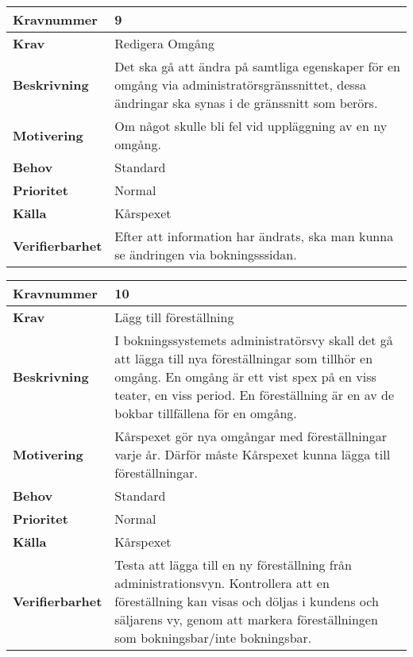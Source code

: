 \documentclass[a4paper, twoside, 11pt, titlepage]{article}
\begin{document}
\begin{tabular} { | p{3cm} | p{12.2cm} | }
	\hline
	\textbf{Kravnummer} & 9  \\
	\hline
	\textbf{Krav} & Redigera Omgång  \\
	\hline
	\textbf{Beskrivning} & Det ska gå att ändra på samtliga egenskaper för en omgång via administratörsgränssnittet, dessa ändringar ska synas i de gränssnitt som berörs.  \\
	\hline
	\textbf{Motivering} & Om något skulle bli fel vid uppläggning av en ny omgång.  \\
	\hline
	\textbf{Behov} & Standard  \\
	\hline
	\textbf{Prioritet} & Normal  \\
	\hline
	\textbf{Källa} & Kårspexet  \\
	\hline
	\textbf{Verifierbarhet} & Efter att information har ändrats, ska man kunna se ändringen via bokningsssidan.  \\
	\hline
\end{tabular}

\begin{tabular} { | p{3cm} | p{12.2cm} | }
	\hline
	\textbf{Kravnummer} & 10  \\
	\hline
	\textbf{Krav} & Lägg till föreställning  \\
	\hline
	\textbf{Beskrivning} & I bokningssystemets administratörsvy skall det gå att lägga till nya föreställningar som tillhör en omgång. En omgång är ett vist spex på en viss teater, en viss period. En föreställning är en av de bokbar tillfällena för en omgång.  \\
	\hline
	\textbf{Motivering} & Kårspexet gör nya omgångar med föreställningar varje år. Därför måste Kårspexet kunna lägga till föreställningar.  \\
	\hline
	\textbf{Behov} & Standard  \\
	\hline
	\textbf{Prioritet} & Normal  \\
	\hline
	\textbf{Källa} & Kårspexet  \\
	\hline
	\textbf{Verifierbarhet} &  Testa att lägga till en ny föreställning från administrationsvyn. Kontrollera att en föreställning kan visas och döljas i kundens och säljarens vy, genom att markera föreställningen som bokningsbar/inte bokningsbar.  \\
	\hline
\end{tabular}
\end{document}
